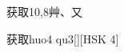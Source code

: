\begin{entry}{获取}{10,8}{⾋、⼜}
  \begin{phonetics}{获取}{huo4 qu3}[][HSK 4]
  \end{phonetics}
\end{entry}
